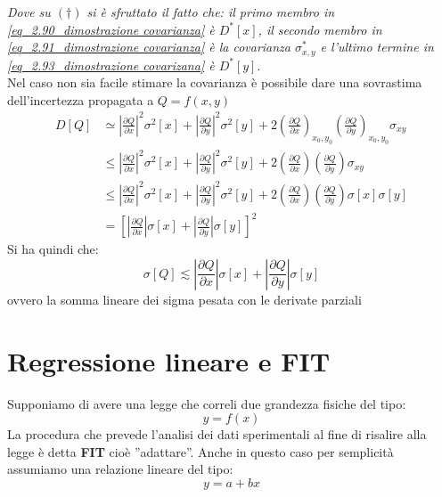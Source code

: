 \documentclass[11pt,a4paper]{book}
\begin{document}
\textit{Dove su $ (\dag) $ si è sfruttato il fatto che: il primo membro in \eqref{eq_2.90_dimostrazione covarianza} è $ D^*[x] $, il secondo membro in \eqref{eq_2.91_dimostrazione covarianza} è la covarianza $ \sigma_{x,y}^* $ e l'ultimo termine in \eqref{eq_2.93_dimostrazione covarizana} è $ D^*[y] $}.\\
Nel caso non sia facile stimare la covarianza è possibile dare una sovrastima dell'incertezza propagata a $ Q = f(x,y) $ 
\begin{align}
D[Q] & \simeq \left| \frac{\partial Q}{\partial x} \right|^2 \sigma^2[x]+\left| \frac{\partial Q}{\partial y} \right|^2 \sigma^2[y] + 2 \left( \frac{\partial Q}{\partial x} \right)_{x_0,y_0} \left( \frac{\partial Q}{\partial y} \right)_{x_0,y_0} \sigma_{xy} \\
& \leq  \left| \frac{\partial Q}{\partial x} \right|^2 \sigma^2[x]+\left| \frac{\partial Q}{\partial y} \right|^2 \sigma^2[y] + 2 \left( \frac{\partial Q}{\partial x} \right) \left( \frac{\partial Q}{\partial y} \right) \sigma_{xy} \\
& \leq \left| \frac{\partial Q}{\partial x} \right|^2 \sigma^2[x]+\left| \frac{\partial Q}{\partial y} \right|^2 \sigma^2[y] + 2 \left( \frac{\partial Q}{\partial x} \right) \left( \frac{\partial Q}{\partial y} \right) \sigma[x] \sigma[y]\\
& = \left[ \left| \frac{\partial Q}{\partial x} \right| \sigma[x] + \left| \frac{\partial Q}{\partial y} \right| \sigma[y] \right]^2
\end{align}
Si ha quindi che:
\begin{equation}
\sigma[Q]\lesssim \left| \frac{\partial Q}{\partial x} \right| \sigma[x]+\left| \frac{\partial Q}{\partial y} \right| \sigma[y]
\end{equation}
ovvero la somma lineare dei sigma pesata con le derivate parziali
\chapter{Regressione lineare e FIT} 
Supponiamo di avere una legge che correli due grandezza fisiche del tipo:
\begin{equation}
y = f(x)
\end{equation}
La procedura che prevede l'analisi dei dati sperimentali al fine di risalire alla legge è detta \textbf{FIT} cioè ''adattare''. Anche in questo caso per semplicità assumiamo una relazione lineare del tipo:
\begin{equation}
y = a +bx
\end{equation}
\end{document}
